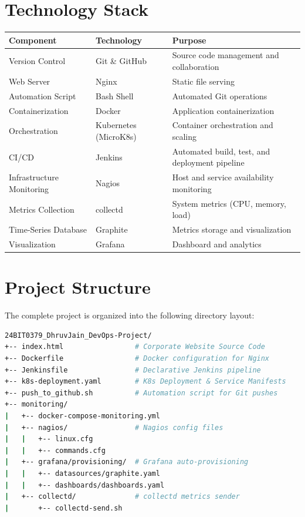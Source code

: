 \documentclass[12pt, a4paper]{article}
\begin{document}
\section{Technology Stack}
\begin{table}[h]
\centering
\renewcommand{\arraystretch}{1.3}
\begin{tabular}{|p{4cm}|p{4cm}|p{7cm}|}
\hline
\textbf{Component} & \textbf{Technology} & \textbf{Purpose} \\ \hline
Version Control & Git \& GitHub & Source code management and collaboration \\ \hline
Web Server & Nginx & Static file serving \\ \hline
Automation Script & Bash Shell & Automated Git operations \\ \hline
Containerization & Docker & Application containerization \\ \hline
Orchestration & Kubernetes (MicroK8s)& Container orchestration and scaling \\ \hline
CI/CD & Jenkins & Automated build, test, and deployment pipeline \\ \hline
Infrastructure Monitoring & Nagios & Host and service availability monitoring \\ \hline
Metrics Collection & collectd & System metrics (CPU, memory, load) \\ \hline
Time-Series Database & Graphite & Metrics storage and visualization \\ \hline
Visualization & Grafana & Dashboard and analytics \\ \hline
\end{tabular}
\end{table}

\section{Project Structure}
The complete project is organized into the following directory layout:
\begin{lstlisting}[language=bash]
24BIT0379_DhruvJain_DevOps-Project/
+-- index.html                 # Corporate Website Source Code
+-- Dockerfile                 # Docker configuration for Nginx
+-- Jenkinsfile                # Declarative Jenkins pipeline
+-- k8s-deployment.yaml        # K8s Deployment & Service Manifests
+-- push_to_github.sh          # Automation script for Git pushes
+-- monitoring/
|   +-- docker-compose-monitoring.yml
|   +-- nagios/                # Nagios config files
|   |   +-- linux.cfg
|   |   +-- commands.cfg
|   +-- grafana/provisioning/  # Grafana auto-provisioning
|   |   +-- datasources/graphite.yaml
|   |   +-- dashboards/dashboards.yaml
|   +-- collectd/              # collectd metrics sender
|       +-- collectd-send.sh
\end{lstlisting}
\end{document}
